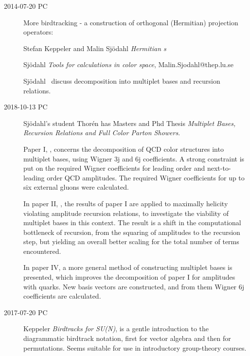 \begin{description}

\item[2014-07-20 PC] More birdtracking - a construction of orthogonal
(Hermitian) projection operators:

{Stefan Keppeler} and Malin Sj{\"o}dahl {\em Hermitian \Ypo s}

Sj{\"o}dahl {\em Tools for calculations in color
space}, Malin.Sjodahl@thep.lu.se

Sj{\"o}dahl \etal\ discuss decomposition into multiplet
  bases and recursion relations.

\item[2018-10-13 PC]
Sj{\"o}dahl's student Thor{\'e}n has Masters and Phd
Thesis
{\em Multiplet Bases, Recursion Relations and Full Color Parton Showers}.

Paper I, , concerns the decomposition of QCD color structures
into multiplet bases, using Wigner 3j and 6j coefficients. A strong constraint
is put on the required Wigner coefficients for leading order and
next-to-leading order QCD amplitudes. The required Wigner coefficients for up
to six external gluons were calculated.

In paper II, , the results of paper I are applied to
maximally helicity violating amplitude recursion relations, to investigate the
viability of multiplet bases in this context. The result is a shift in the
computational bottleneck of recursion, from the squaring of amplitudes to the
recursion step, but yielding an overall better scaling for the total number of
terms encountered.

In paper IV,  a more general method of constructing multiplet
bases is presented, which improves the decomposition of paper I for amplitudes
with quarks. New basis vectors are constructed, and from
them Wigner 6j coefficients are calculated.


\item[2017-07-20 PC] Keppeler
{\em {Birdtracks for SU(N)}},  is
a gentle introduction to the diagrammatic birdtrack notation, first for
vector algebra and then for permutations. Seems suitable for use in
introductory group-theory courses.

\end{description}

